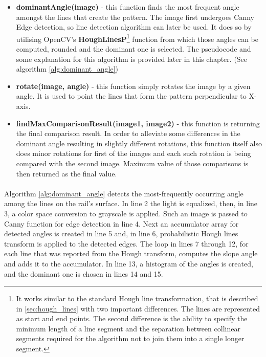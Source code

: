 \begin{itemize}
	\item \textbf{dominantAngle(image)} - this function finds the most frequent angle amongst the lines that create the pattern. The image first undergoes Canny Edge detection, so line detection algorithm can later be used. It does so by utilising OpenCV's \textbf{HoughLinesP}\footnote{It works similar to the standard Hough line transformation, that is described in \autoref{sec:hough_lines} with two important differences. The lines are represented as start and end points. The second difference is the ability to specify the minimum length of a line segment and the separation between collinear segments required for the algorithm not to join them into a single longer segment.\cite{learning-opencv-3}} function from which those angles can be computed, rounded and the dominant one is selected. The pseudocode and some explanation for this algorithm is provided later in this chapter. (See algorithm \ref{alg:dominant_angle})
	\item \textbf{rotate(image, angle)} - this function simply rotates the image by a given angle. It is used to point the lines that form the pattern perpendicular to X-axis.
	\item \textbf{findMaxComparisonResult(image1, image2)} - this function is returning the final comparison result. In order to alleviate some differences in the dominant angle resulting in slightly different rotations, this function itself also does minor rotations for first of the images and each such rotation is being compared with the second image. Maximum value of those comparisons is then returned as the final value.
\end{itemize}

\paragraph{}
Algorithm \ref{alg:dominant_angle} detects the most-frequently occurring angle among the lines on the rail's surface. In line 2 the light is equalized, then, in line 3, a color space conversion to grayscale is applied. Such an image is passed to Canny function for edge detection in line 4. Next an accumulator array for detected angles is created in line 5 and, in line 6, probabilistic Hough lines transform is applied to the detected edges. The loop in lines 7 through 12, for each line that was reported from the Hough transform, computes the slope angle and adds it to the accumulator. In line 13, a histogram of the angles is created, and the dominant one is chosen in lines 14 and 15.

